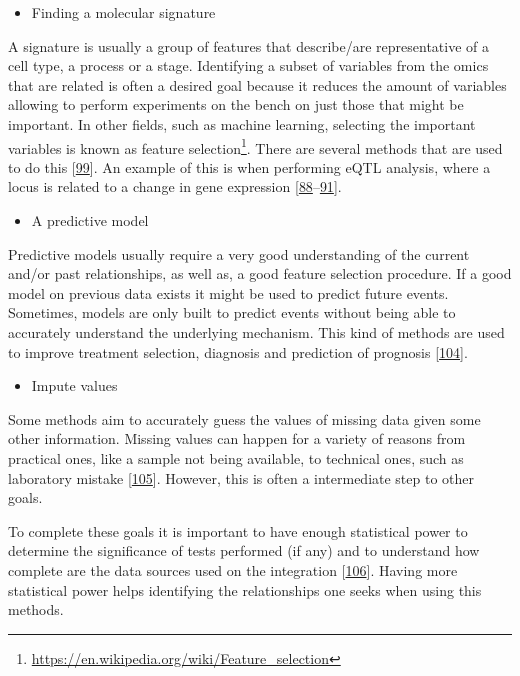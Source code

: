 \documentclass[
  a4paper,
]{book}
\DeclareRobustCommand{\href}[2]{#2\footnote{\url{#1}}}
\providecommand{\tightlist}{%
  \setlength{\itemsep}{0pt}\setlength{\parskip}{0pt}}
\begin{document}
\begin{itemize}
\tightlist
\item
  Finding a molecular signature
\end{itemize}

A signature is usually a group of features that describe/are representative of a cell type, a process or a stage.
Identifying a subset of variables from the omics that are related is often a desired goal because it reduces the amount of variables allowing to perform experiments on the bench on just those that might be important.
In other fields, such as machine learning, selecting the important variables is known as \href{https://en.wikipedia.org/wiki/Feature_selection}{feature selection}.
There are several methods that are used to do this {[}\protect\hyperlink{ref-cavill2016}{99}{]}.
An example of this is when performing eQTL analysis, where a locus is related to a change in gene expression {[}\protect\hyperlink{ref-repnik2016}{88}--\protect\hyperlink{ref-dai2019}{91}{]}.

\begin{itemize}
\tightlist
\item
  A predictive model
\end{itemize}

Predictive models usually require a very good understanding of the current and/or past relationships, as well as, a good feature selection procedure.
If a good model on previous data exists it might be used to predict future events.
Sometimes, models are only built to predict events without being able to accurately understand the underlying mechanism.
This kind of methods are used to improve treatment selection, diagnosis and prediction of prognosis {[}\protect\hyperlink{ref-wheeler2014}{104}{]}.

\begin{itemize}
\tightlist
\item
  Impute values
\end{itemize}

Some methods aim to accurately guess the values of missing data given some other information.
Missing values can happen for a variety of reasons from practical ones, like a sample not being available, to technical ones, such as laboratory mistake {[}\protect\hyperlink{ref-yin2019}{105}{]}.
However, this is often a intermediate step to other goals.

To complete these goals it is important to have enough statistical power to determine the significance of tests performed (if any) and to understand how complete are the data sources used on the integration {[}\protect\hyperlink{ref-tarazona2021}{106}{]}.
Having more statistical power helps identifying the relationships one seeks when using this methods.
\end{document}
